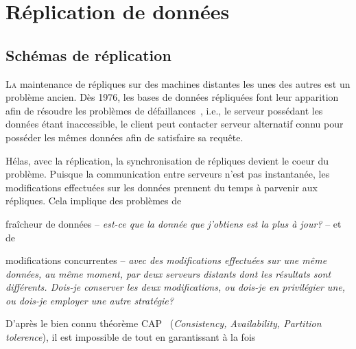 
\part{Réplication de données}
\chapter{Schémas de réplication}

\lettrine{L}a maintenance de répliques sur des machines distantes les unes des
autres est un problème ancien. Dès 1976, les bases de données répliquées font
leur apparition afin de résoudre les problèmes de
défaillances~\cite{alsberg1976principle}, i.e., le serveur possédant les données
étant inaccessible, le client peut contacter serveur alternatif connu pour
posséder les mêmes données afin de satisfaire sa requête.

Hélas, avec la réplication, la synchronisation de répliques devient le coeur du
problème. Puisque la communication entre serveurs n'est pas instantanée, les
modifications effectuées sur les données prennent du temps à parvenir aux
répliques. Cela implique des problèmes de
\begin{inparaenum}[(i)]
\item fraîcheur de données -- \emph{est-ce que la donnée que j'obtiens est la
    plus à jour?} -- et de
\item modifications concurrentes -- \emph{avec des modifications effectuées sur
    une même données, au même moment, par deux serveurs distants dont les
    résultats sont différents. Dois-je conserver les deux modifications, ou
    dois-je en privilégier une, ou dois-je employer une autre stratégie?}
\end{inparaenum}

D'après le bien connu théorème CAP~\cite{gilbert2002brewer} (\emph{Consistency,
  Availability, Partition tolerence}), il est impossible de  tout en garantissant à la fois 

